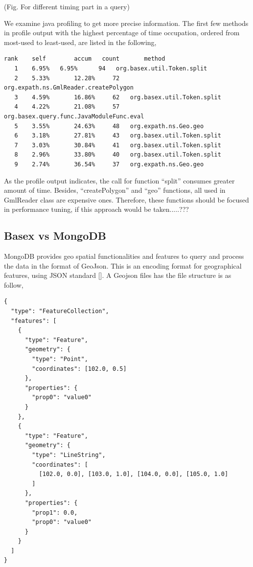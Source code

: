 \documentclass[a4paper,12pt]{article}
\begin{document}
(Fig. For different timing part in a query)

We examine java profiling to get more precise information. The first few methods in profile output with the highest percentage of time occupation, ordered from most-used to least-used, are listed in the following,
\begin{verbatim}
rank   	self  		accum   count   	method
   1 	6.95%  	6.95%      94  	org.basex.util.Token.split
   2  	5.33% 		12.28%     72 	org.expath.ns.GmlReader.createPolygon
   3  	4.59% 		16.86%     62  	org.basex.util.Token.split
   4  	4.22% 		21.08%     57  	org.basex.query.func.JavaModuleFunc.eval
   5  	3.55% 		24.63%     48  	org.expath.ns.Geo.geo
   6  	3.18% 		27.81%     43 	org.basex.util.Token.split
   7 	3.03% 		30.84%     41  	org.basex.util.Token.split
   8  	2.96% 		33.80%     40  	org.basex.util.Token.split
   9  	2.74% 		36.54%     37  	org.expath.ns.Geo.geo
\end{verbatim} 
 As the profile output indicates, the call for function “split” consumes greater amount of time. Besides, “createPolygon” and “geo” functions, all used in GmlReader class are expensive ones. Therefore, these functions should be focused in performance tuning, if this approach would be taken.....???











\subsection{Basex vs MongoDB}
MongoDB provides geo spatial functionalities and features to query and process the data in the format of GeoJson. This is an encoding format for geographical features, using JSON standard []. A Geojson files has the file structure is as follow,
\begin{verbatim}
{
  "type": "FeatureCollection",
  "features": [
    {
      "type": "Feature",
      "geometry": {
        "type": "Point",
        "coordinates": [102.0, 0.5]
      },
      "properties": {
        "prop0": "value0"
      }
    },
    {
      "type": "Feature",
      "geometry": {
        "type": "LineString",
        "coordinates": [
          [102.0, 0.0], [103.0, 1.0], [104.0, 0.0], [105.0, 1.0]
        ]
      },
      "properties": {
        "prop1": 0.0,
        "prop0": "value0"
      }
    }
  ]
}
\end{verbatim}
\end{document}
